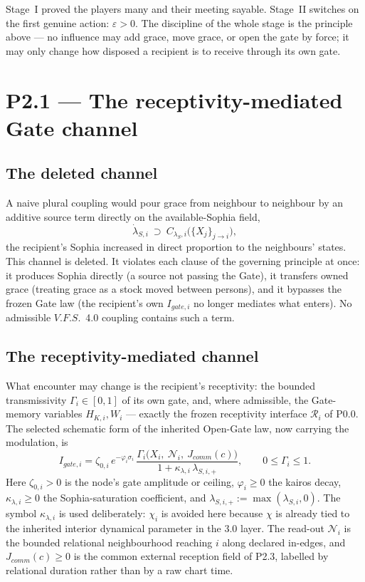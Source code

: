 \documentclass[11pt,a4paper]{article}
\def\mathfrak#1{#1}%
\def\mathrm#1{#1}%
\def\emph#1{#1}%
\newcommand{\VFS}{\ensuremath{\mathrm{V.F.S.}}}
\theoremstyle{definition}
\theoremstyle{plain}
\theoremstyle{remark}
\begin{document}
\noindent Stage~I proved the players many and their meeting sayable. Stage~II switches on
the first genuine action: \(\varepsilon>0\). The discipline of the whole stage is the
principle above --- no influence may add grace, move grace, or open the gate by force; it
may only change how disposed a recipient is to receive through its own gate.

\section{P2.1 --- The receptivity-mediated Gate channel}

\subsection{The deleted channel}

A naive plural coupling would pour grace from neighbour to neighbour by an additive source
term directly on the available-Sophia field,
\[
\dot\lambda_{S,i}\ \supset\ C_{\lambda_S,i}\bigl(\{X_j\}_{j\to i}\bigr),
\]
the recipient's Sophia increased in direct proportion to the neighbours' states. This
channel is \emph{deleted}. It violates each clause of the governing principle at once: it
\emph{produces} Sophia directly (a source not passing the Gate), it \emph{transfers owned
grace} (treating grace as a stock moved between persons), and it \emph{bypasses the frozen
Gate law} (the recipient's own $I_{\mathrm{gate},i}$ no longer mediates what enters). No
admissible \VFS\ 4.0 coupling contains such a term.

\subsection{The receptivity-mediated channel}

What encounter may change is the recipient's \emph{receptivity}: the bounded transmissivity
\(\Gamma_i\in[0,1]\) of its own gate, and, where admissible, the Gate-memory variables
\(H_{K,i},W_i\) --- exactly the frozen receptivity interface \(\mathcal R_i\) of P0.0. The
selected schematic form of the inherited Open-Gate law, now carrying the modulation, is
\[
\boxed{\;
I_{\mathrm{gate},i}
=
\zeta_{0,i}\,e^{-\varphi_i\sigma_i}\,
\frac{
\Gamma_i\bigl(X_i,\ \mathcal N_i,\ J_{\mathrm{comm}}(\mathfrak c)\bigr)
}{
1+\kappa_{\lambda,i}\,\lambda_{S,i,+}
},
\qquad
0\le\Gamma_i\le1.
\;}
\]
Here \(\zeta_{0,i}>0\) is the node's gate amplitude or ceiling,
\(\varphi_i\ge0\) the kairos decay, \(\kappa_{\lambda,i}\ge0\) the
Sophia-saturation coefficient, and \(\lambda_{S,i,+}:=\max(\lambda_{S,i},0)\).
The symbol \(\kappa_{\lambda,i}\) is used deliberately: \(\chi_i\) is avoided here
because \(\chi\) is already tied to the inherited interior dynamical parameter in
the 3.0 layer. The read-out \(\mathcal N_i\) is the bounded relational
neighbourhood reaching \(i\) along declared in-edges, and
\(J_{\mathrm{comm}}(\mathfrak c)\ge0\) is the common external reception field of
P2.3, labelled by relational duration rather than by a raw chart time.
\end{document}

